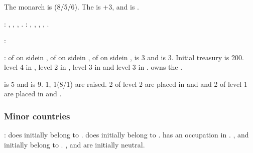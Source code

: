 \subsubsection{\paysmajeurVenise}
\aparag The monarch is \monarqueBarbarigo (8/5/6). The \STAB is +3, and \VEN
is .

: \provinceVeneto, \provinceMantova,
\provinceFriuli, \provinceIstria.
: \provinceDalmacija, \provinceCorfu, \provinceKreta,
\provinceCyclades, \provinceChypre.

:
\begin{modlist}
\item[\SUB] \paysmamelouks
\end{modlist}

:
\bparag \MNU of  on side\faceplus in \provinceVeneto, \MNU of
 on side\facemoins in \provinceVeneto, \MNU of  on
side\facemoins in \provinceChypre, \FTI is 3 and \DTI is 3.
\bparag Initial treasury is 200\ducats.
\bparag \TradeFLEET level 4 in , level 2 in , level 3
in  and level 3 in . \VEN owns the
.

\aparag {} is 5 and  is
9. 1\ARMY\facemoins, 1\FLEET\faceplus (8\NGD/1\NTD) are raised. 2 \Presidios
of level 2 are placed in \provinceMoreas and \provinceAlabania and 2 of level
1 are placed in \provinceHellas and \provinceMontenegro.


\subsubsection{Minor countries}
\aparag[Provinces]:
\bparag \provinceTrentino does initially belong to \paysHabsbourg.
\bparag \provinceBresse does initially belong to \paysSavoie.
\bparag[] [BLP] \paysSavoie has an occupation in \provinceDauphine.
\bparag \provinceGotland, \provinceVastergotland and \provinceSkane initially
belong to \paysdanemark.
\bparag \provinceMontenegro, \provinceSerbia and \provinceBosna are initially
neutral.

